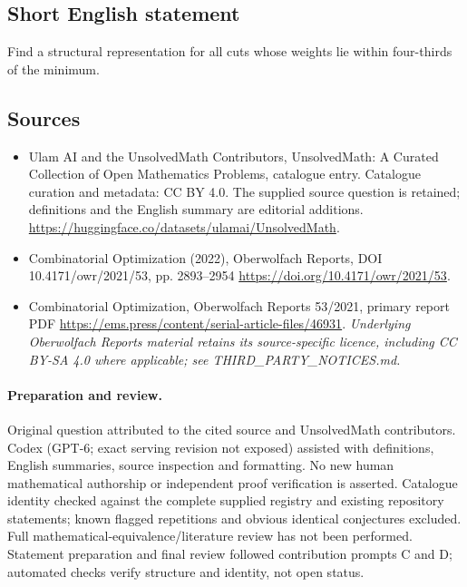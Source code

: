 \documentclass[11pt]{article}
\begin{document}
\subsection{Short English statement}
Find a structural representation for all cuts whose weights lie within four-thirds of the minimum.
\subsection{Sources}
\begin{itemize}
\item[\hypertarget{source:statement:1}{S1}] Ulam AI and the UnsolvedMath Contributors, UnsolvedMath: A Curated Collection of Open Mathematics Problems, catalogue entry. Catalogue curation and metadata: CC BY 4.0. The supplied source question is retained; definitions and the English summary are editorial additions.
\url{https://huggingface.co/datasets/ulamai/UnsolvedMath}.
\item[\hypertarget{source:statement:2}{S2}] Combinatorial Optimization (2022), Oberwolfach Reports, DOI 10.4171/owr/2021/53, pp. 2893--2954
\url{https://doi.org/10.4171/owr/2021/53}.
\item[\hypertarget{source:statement:3}{S3}] Combinatorial Optimization, Oberwolfach Reports 53/2021, primary report PDF
\url{https://ems.press/content/serial-article-files/46931}.
\textit{Underlying Oberwolfach Reports material retains its source-specific licence, including CC BY-SA 4.0 where applicable; see THIRD\_PARTY\_NOTICES.md.}
\end{itemize}
\paragraph{Preparation and review.}
Original question attributed to the cited source and UnsolvedMath contributors. Codex (GPT-6; exact serving revision not exposed) assisted with definitions, English summaries, source inspection and formatting. No new human mathematical authorship or independent proof verification is asserted. Catalogue identity checked against the complete supplied registry and existing repository statements; known flagged repetitions and obvious identical conjectures excluded. Full mathematical-equivalence/literature review has not been performed. Statement preparation and final review followed contribution prompts C and D; automated checks verify structure and identity, not open status.
\label{end:statement}
\end{document}
